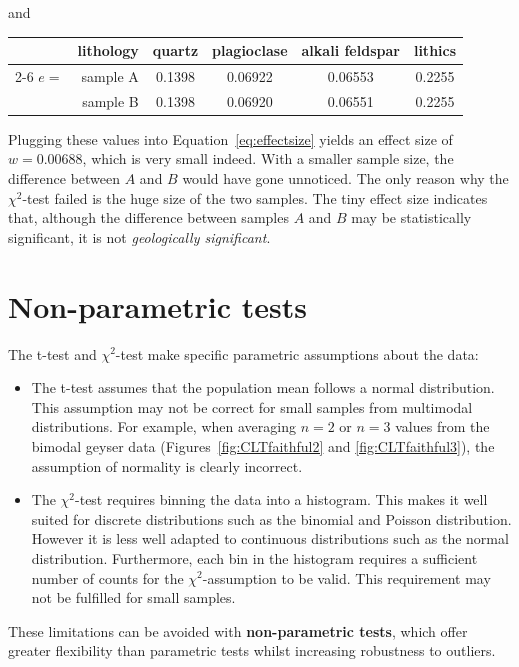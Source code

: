 \noindent and

\begin{center}
  \begin{tabular}{rr|cccc}
    & lithology & quartz & plagioclase & alkali feldspar & lithics  \\
    \cline{2-6}
    $e = $ & sample A & 0.1398 & 0.06922 & 0.06553 & 0.2255 \\
    & sample B & 0.1398 & 0.06920 & 0.06551 & 0.2255
  \end{tabular}
\end{center}

Plugging these values into Equation~\ref{eq:effectsize} yields an
effect size of $w=0.00688$, which is very small indeed. With a smaller
sample size, the difference between $A$ and $B$ would have gone
unnoticed.  The only reason why the $\chi^2$-test failed is the huge
size of the two samples. The tiny effect size indicates that, although
the difference between samples $A$ and $B$ may be statistically
significant, it is not \textit{geologically significant}.

\section{Non-parametric tests}
\label{sec:nonparametric}

The t-test and $\chi^2$-test make specific parametric assumptions
about the data:

\begin{itemize}
  \item The t-test assumes that the population mean follows a normal
    distribution. This assumption may not be correct for small samples
    from multimodal distributions. For example, when averaging $n=2$
    or $n=3$ values from the bimodal geyser data
    (Figures~\ref{fig:CLTfaithful2} and \ref{fig:CLTfaithful3}), the
    assumption of normality is clearly incorrect.
  \item The $\chi^2$-test requires binning the data into a
    histogram. This makes it well suited for discrete distributions
    such as the binomial and Poisson distribution. However it is less
    well adapted to continuous distributions such as the normal
    distribution. Furthermore, each bin in the histogram requires a
    sufficient number of counts for the $\chi^2$-assumption to be
    valid. This requirement may not be fulfilled for small samples.
\end{itemize}

These limitations can be avoided with \textbf{non-parametric tests},
which offer greater flexibility than parametric tests whilst
increasing robustness to outliers.\medskip

